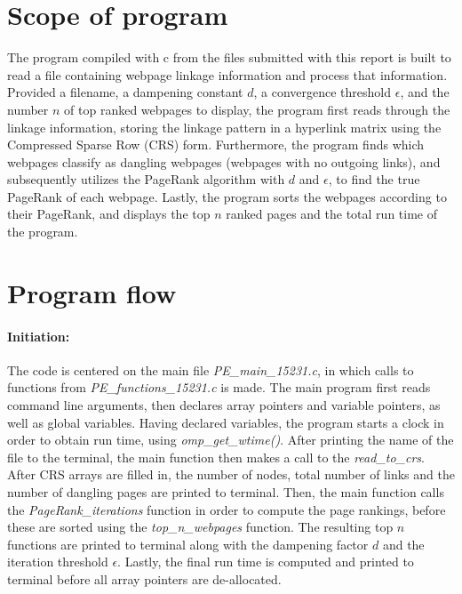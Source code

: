 \documentclass[%
oneside,                 %
final,                   %
10pt]{article}
\begin{document}
\section{Scope of program}
The program compiled with c from the files submitted with this report is built to read a file containing webpage linkage information and process that information. Provided a filename, a dampening constant $d$, a convergence threshold $\epsilon$, and the number $n$ of top ranked webpages to display, the program first reads through the linkage information, storing the linkage pattern in a hyperlink matrix using the Compressed Sparse Row (CRS) form. Furthermore, the program finds which webpages classify as dangling webpages (webpages with no outgoing links), and subsequently utilizes the PageRank algorithm with $d$ and $\epsilon$,  to find the true PageRank of each webpage.  Lastly, the program sorts the webpages according to their PageRank, and displays the top $n$ ranked pages and the total run time of the program.

\section{Program flow}
\paragraph{Initiation:}
The code is centered on the main file \textit{PE\_main\_15231.c}, in which calls to functions from \textit{PE\_functions\_15231.c} is made. The main program first reads command line arguments, then declares array pointers and variable pointers, as well as global variables. Having declared variables, the program starts a clock in order to obtain run time, using \textit{omp\_get\_wtime()}. After printing the name of the file to the terminal, the main function then makes a call to the \textit{read\_to\_crs}. After CRS arrays are filled in, the number of nodes, total number of links and the number of dangling pages are printed to terminal. Then, the main function calls the \textit{PageRank\_iterations} function in order to compute the page rankings, before these are sorted using the \textit{top\_n\_webpages} function. The resulting top $n$ functions are printed to terminal along with the dampening factor $d$ and the iteration threshold $\epsilon$. Lastly, the final run time is computed and printed to terminal before all array pointers are de-allocated.
\end{document}
